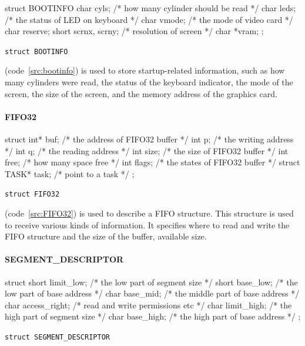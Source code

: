 \documentclass{swfcthesis}
\begin{document}
\begin{listing}[H]
  \begin{codeblock}
\begin{ccode}
struct BOOTINFO
{
  char cyls;          /* how many cylinder should be read */
  char leds;          /* the status of LED on keyboard */
  char vmode;         /* the mode of video card */
  char reserve;
  short scrnx, scrny; /* resolution of screen */
  char *vram;
};
\end{ccode}
  \end{codeblock}
  \caption{\texttt{struct BOOTINFO}}\label{src:bootinfo}
\end{listing}

(code~\ref{src:bootinfo}) is used to store startup-related
information, such as how many cylinders were read, the status of the keyboard indicator,
the mode of the screen, the size of the screen, and the memory address of the graphics
card.


\paragraph{FIFO32}

\begin{listing}[H]
  \begin{codeblock}
\begin{ccode}
struct 
{ 
  int* buf;          /* the address of FIFO32 buffer */
  int p;             /* the writing address */
  int q;             /* the reading address */
  int size;          /* the size of FIFO32 buffer */
  int free;          /* how many space free */
  int flags;         /* the states of FIFO32 buffer */
  struct TASK* task; /* point to a task */ 
};
\end{ccode}
  \end{codeblock}
  \caption{\texttt{struct FIFO32}}\label{src:FIFO32}
\end{listing}

(code~\ref{src:FIFO32}) is used to
describe a FIFO structure. This structure is used to receive various kinds of
information. It specifies where to read and write the FIFO structure and the size of the
buffer, available size.


\paragraph{SEGMENT\_DESCRIPTOR}

\begin{listing}[H]
  \begin{codeblock}
\begin{ccode}
struct 
{ 
  short limit_low;   /* the low part of segment size */
  short base_low;    /* the low part of base address */
  char base_mid;     /* the middle part of base address */
  char access_right; /* read and write permissions etc */
  char  limit_high;  /* the high part of segment size */
  char base_high;    /* the high part of base address */
};
\end{ccode}
  \end{codeblock}
  \caption{\texttt{struct SEGMENT\_DESCRIPTOR}}\label{src:DESCRIPTOR}
\end{listing}
\end{document}
